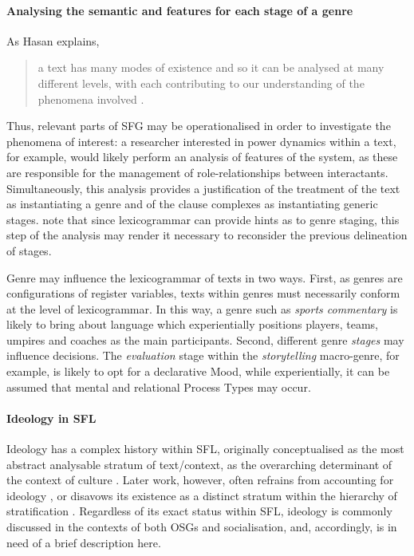 \paragraph{Analysing the semantic and  features for each stage of a genre}

As Hasan explains,

\begin{quote}\singlespacing\small
a text has many modes of existence and so it can be analysed at many different levels, with each contributing to our understanding of the phenomena involved \parencite*[p.~116]{halliday_language_1989}.
\end{quote}
%
\noindent Thus, relevant parts of \gls{SFG} may be operationalised in order to investigate the phenomena of interest: a researcher interested in power dynamics within a text, for example, would likely perform an analysis of features of the  system, as these are responsible for the management of role\hyp{}relationships between interactants. Simultaneously, this analysis provides a justification of the treatment of the text as instantiating a genre and of the clause complexes as instantiating generic stages. \textcite{eggins_analysing_2004} note that since \gls{lexicogrammar} can provide hints as to genre staging, this step of the analysis may render it necessary to reconsider the previous delineation of stages.

Genre may influence the \gls{lexicogrammar} of texts in two ways. First, as genres are configurations of register variables, texts within genres must necessarily conform at the level of lexicogrammar. In this way, a genre such as \emph{sports commentary} is likely to bring about language which experientially positions players, teams, umpires and coaches as the main participants. Second, different genre \emph{stages} may influence  decisions. The \emph{evaluation} stage within the \emph{storytelling} macro\hyp{}genre, for example, is likely to opt for a declarative Mood, while experientially, it can be assumed that mental and relational Process Types may occur.

\paragraph{Ideology in SFL}

Ideology has a complex history within \gls{SFL}, originally conceptualised as the most abstract analysable stratum of text\slash context, as the overarching determinant of the context of culture \cite{eggins_introduction_2004}. Later work, however, often refrains from accounting for ideology \cite[e.g.][]{matthiessen_key_2010}, or disavows its existence as a distinct stratum within the hierarchy of stratification \cite[e.g.]{martin_genre_2006}. Regardless of its exact status within \gls{SFL}, ideology is commonly discussed in the contexts of both \glspl{OSG} and socialisation, and, accordingly, is in need of a brief description here.

